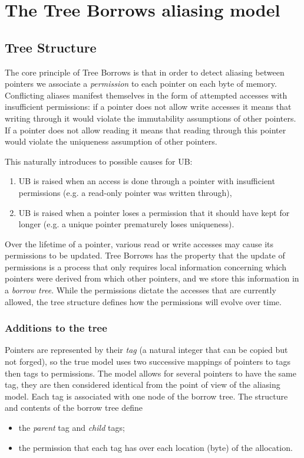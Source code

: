 \documentclass[a4paper,11pt]{article}
\theoremstyle{plain}
\theoremstyle{definition}
\theoremstyle{remark}
\begin{document}
\section{The Tree Borrows aliasing model}

\subsection{Tree Structure}
\label{sec:tree-structure}

The core principle of Tree Borrows is that in order to detect aliasing between
pointers we associate a \textit{permission} to each pointer on each byte of memory.
Conflicting aliases manifest themselves in the form of attempted accesses with
insufficient permissions: if a pointer does not allow write accesses it means that
writing through it would violate the immutability assumptions of other pointers.
If a pointer does not allow reading it means that reading through this pointer
would violate the uniqueness assumption of other pointers.

This naturally introduces to possible causes for UB:
\begin{enumerate}
    \item UB is raised when an access is done through a pointer with insufficient permissions
        (e.g. a read-only pointer was written through),
    \item UB is raised when a pointer loses a permission that it should have kept for longer
        (e.g. a unique pointer prematurely loses uniqueness).
\end{enumerate}

Over the lifetime of a pointer, various read or write accesses may cause its permissions to be updated.
Tree Borrows has the property that the update of permissions is a process
that only requires local information concerning which pointers were derived from
which other pointers, and we store this information in a \textit{borrow tree}.
While the permissions dictate the accesses that are currently allowed, the tree
structure defines how the permissions will evolve over time.

\subsubsection{Additions to the tree}
\label{sec:tree_additions}

Pointers are represented by their \textit{tag} (a natural integer that can
be copied but not forged), so the true model uses two successive mappings of pointers to tags then
tags to permissions. The model allows for several pointers to have the same tag,
they are then considered identical from the point of view of the aliasing model.
Each tag is associated with one node of the borrow tree. The structure and contents of the borrow tree
define
\begin{itemize}
    \item the \textit{parent} tag and \textit{child} tags;
    \item the permission that each tag has over each location (byte) of the allocation.
\end{itemize}
\end{document}
